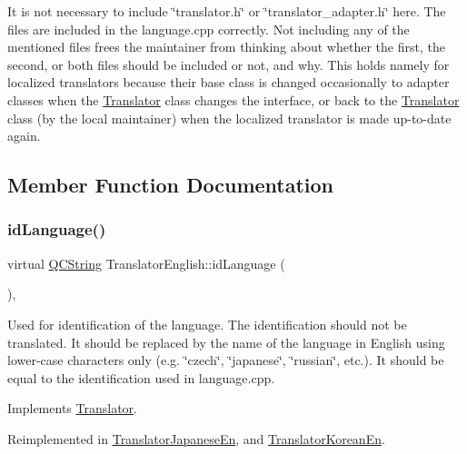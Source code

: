 It is not necessary to include \char`\"{}translator.\+h\char`\"{} or \char`\"{}translator\+\_\+adapter.\+h\char`\"{} here. The files are included in the language.\+cpp correctly. Not including any of the mentioned files frees the maintainer from thinking about whether the first, the second, or both files should be included or not, and why. This holds namely for localized translators because their base class is changed occasionally to adapter classes when the \mbox{\hyperlink{class_translator}{Translator}} class changes the interface, or back to the \mbox{\hyperlink{class_translator}{Translator}} class (by the local maintainer) when the localized translator is made up-\/to-\/date again. 

\subsection{Member Function Documentation}
\mbox{\label{class_translator_english_a940d6ef2aa0aa8a8011426219d145a53}} 
\subsubsection{\texorpdfstring{idLanguage()}{idLanguage()}}
{\footnotesize\ttfamily virtual \mbox{\hyperlink{class_q_c_string}{Q\+C\+String}} Translator\+English\+::id\+Language (\begin{DoxyParamCaption}{ }\end{DoxyParamCaption})\hspace{0.3cm}{\ttfamily [inline]}, {\ttfamily [virtual]}}

Used for identification of the language. The identification should not be translated. It should be replaced by the name of the language in English using lower-\/case characters only (e.\+g. \char`\"{}czech\char`\"{}, \char`\"{}japanese\char`\"{}, \char`\"{}russian\char`\"{}, etc.). It should be equal to the identification used in language.\+cpp. 

Implements \mbox{\hyperlink{class_translator}{Translator}}.



Reimplemented in \mbox{\hyperlink{class_translator_japanese_en_a920e7fc0a427b655de47f4085d331099}{Translator\+Japanese\+En}}, and \mbox{\hyperlink{class_translator_korean_en_a255647e0edbc0550871133c143cc08a7}{Translator\+Korean\+En}}.

